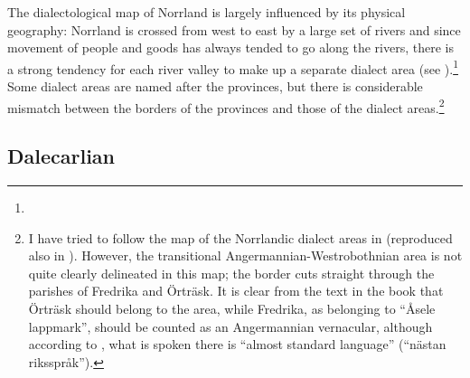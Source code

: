 The dialectological map of Norrland is largely influenced by its physical geography: Norrland is crossed from west to east by a large set of rivers and since movement of people and goods has always tended to go along the rivers, there is a strong tendency for each river valley to make up a separate dialect area (see ).\footnote{ } Some dialect areas are named after the provinces, but there is considerable mismatch between the borders of the provinces and those of the dialect areas.\footnote{ I have tried to follow the map of the Norrlandic dialect areas in \citet[230]{ÅgrenEtAl1954} (reproduced also in \citet{Dahlstedt1971}). However, the transitional Angermannian-Westrobothnian area is not quite clearly delineated in this map; the border cuts straight through the parishes of Fredrika and Örträsk. It is clear from the text in the book that Örträsk should belong to the area, while Fredrika, as belonging to “Åsele lappmark”, should be counted as an Angermannian vernacular, although according to \citet[289]{Ågren1954}, what is spoken there is “almost standard language” (“nästan riksspråk”). } 

\subsection{ Dalecarlian}

